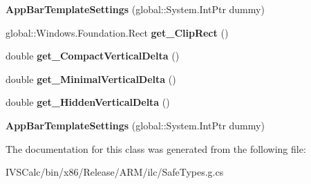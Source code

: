 \begin{DoxyCompactItemize}
{\bfseries App\+Bar\+Template\+Settings} (global\+::\+System.\+Int\+Ptr dummy)
\item 
\mbox{\label{class_windows_1_1_u_i_1_1_xaml_1_1_controls_1_1_primitives_1_1_app_bar_template_settings_aae6b4ed047ffd9cbeb7b1e90631f219f}} 
global\+::\+Windows.\+Foundation.\+Rect {\bfseries get\+\_\+\+Clip\+Rect} ()
\item 
\mbox{\label{class_windows_1_1_u_i_1_1_xaml_1_1_controls_1_1_primitives_1_1_app_bar_template_settings_ad1ca4d25872d941e7269ab8d4692c7d1}} 
double {\bfseries get\+\_\+\+Compact\+Vertical\+Delta} ()
\item 
\mbox{\label{class_windows_1_1_u_i_1_1_xaml_1_1_controls_1_1_primitives_1_1_app_bar_template_settings_a3a496bd5844770ebff5d885c60aefe2c}} 
double {\bfseries get\+\_\+\+Minimal\+Vertical\+Delta} ()
\item 
\mbox{\label{class_windows_1_1_u_i_1_1_xaml_1_1_controls_1_1_primitives_1_1_app_bar_template_settings_aecda5674e8202fa2f1bd6587604cdea7}} 
double {\bfseries get\+\_\+\+Hidden\+Vertical\+Delta} ()
\item 
\mbox{\label{class_windows_1_1_u_i_1_1_xaml_1_1_controls_1_1_primitives_1_1_app_bar_template_settings_aeb4138ee9f5fbb3ab37d0aca4a795ca1}} 
{\bfseries App\+Bar\+Template\+Settings} (global\+::\+System.\+Int\+Ptr dummy)
\end{DoxyCompactItemize}


The documentation for this class was generated from the following file\+:\begin{DoxyCompactItemize}
\item 
I\+V\+S\+Calc/bin/x86/\+Release/\+A\+R\+M/ilc/Safe\+Types.\+g.\+cs\end{DoxyCompactItemize}
